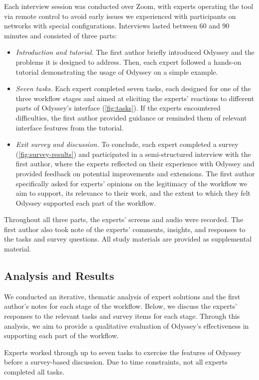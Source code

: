 Each interview session was conducted over Zoom, 
  with experts operating the tool via remote control 
  to avoid early issues we experienced with participants on networks
  with special configurations.
Interviews lasted between 60 and 90 minutes
  and consisted of three parts:
\begin{itemize}
  \item \textit{Introduction and tutorial.} 
The first author briefly introduced Odyssey 
  and the problems it is designed to address. 
Then, each expert followed a hands-on tutorial 
  demonstrating the usage of Odyssey on a simple example.
\item \textit{Seven tasks.} Each expert completed seven tasks, each designed
for one of the three workflow stages and aimed at eliciting the experts'
reactions to different parts of Odyssey's interface (\autoref{fig:tasks}). If the experts
encountered difficulties, the first author provided guidance or reminded
them of relevant interface features from the tutorial.
\item \textit{Exit survey and discussion.} To conclude, each expert
completed a survey (\autoref{fig:survey-results}) 
and participated in a semi-structured interview with the
first author, where the experts reflected on their experience with Odyssey
and provided feedback on potential improvements and extensions. The first
author specifically asked for experts' opinions on the legitimacy of the
workflow we aim to support, its relevance to their work, and the extent to
which they felt Odyssey supported each part of the workflow.
\end{itemize}
Throughout all three parts, the experts' screens and audio were recorded. The
first author also took note of the experts' comments, insights, and responses to
the tasks and survey questions. All study materials are provided as supplemental material.

\subsection{Analysis and Results}
We conducted an iterative, thematic analysis of expert solutions and the first
author's notes for each stage of the workflow. Below, we discuss the experts'
responses to the relevant tasks and survey items for each stage. Through this
analysis, we aim to provide a qualitative evaluation of Odyssey's effectiveness
in supporting each part of the workflow.

\begin{table*}
  \centering
  
  \caption {Experts worked through up to seven tasks to exercise the features of Odyssey before a survey-based discussion. Due to time constraints, 
  not all experts completed all tasks.}
  \label{fig:tasks}
\end{table*}

